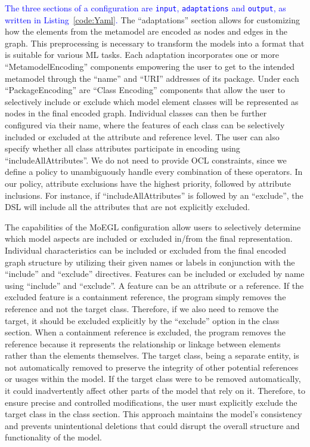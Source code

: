 \documentclass[journal,article,submit,moreauthors,technologies]{Definitions/mdpi}
\newcommand{\rev}[1]{\textcolor{blue}{#1}}
\begin{document}
\rev{The three sections of a configuration are \texttt{input}, \texttt{adaptations} and \texttt{output}, as written in Listing~\ref{code:Yaml}.} The ``adaptations'' section allows for customizing how the elements from the metamodel are encoded as nodes and edges in the graph. This preprocessing is necessary to transform the models into a format that is suitable for various ML tasks. Each adaptation incorporates one or more ``MetamodelEncoding'' components empowering the user to get to the intended metamodel through the ``name'' and ``URI'' addresses of its package. Under each ``PackageEncoding'' are ``Class Encoding'' components that allow the user to selectively include or exclude which model element classes will be represented as nodes in the final encoded graph. Individual classes can then be further configured via their name, where the features of each class can be selectively included or excluded at the attribute and reference level. The user can also specify whether all class attributes participate in encoding using ``includeAllAttributes''. We do not need to provide OCL constraints, since we define a policy to unambiguously handle every combination of these operators. In our policy, attribute exclusions have the highest priority, followed by attribute inclusions. For instance, if ``includeAllAttributes'' is followed by an ``exclude'', the DSL will include all the attributes that are not explicitly excluded.

The capabilities of the MoEGL configuration allow users to selectively determine which model aspects are included or excluded in/from the final representation. Individual characteristics can be included or excluded from the final encoded graph structure by utilizing their given names or labels in conjunction with the ``include'' and ``exclude'' directives. Features can be included or excluded by name using ``include'' and ``exclude''. A feature can be an attribute or a reference. If the excluded feature is a containment reference, the program simply removes the reference and not the target class. Therefore, if we also need to remove the target, it should be excluded explicitly by the ``exclude'' option in the class section. When a containment reference is excluded, the program removes the reference because it represents the relationship or linkage between elements rather than the elements themselves. The target class, being a separate entity, is not automatically removed to preserve the integrity of other potential references or usages within the model. If the target class were to be removed automatically, it could inadvertently affect other parts of the model that rely on it. Therefore, to ensure precise and controlled modifications, the user must explicitly exclude the target class in the class section. This approach maintains the model's consistency and prevents unintentional deletions that could disrupt the overall structure and functionality of the model.
\end{document}
